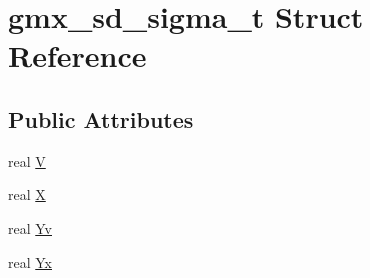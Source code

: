 \hypertarget{structgmx__sd__sigma__t}{\section{gmx\-\_\-sd\-\_\-sigma\-\_\-t \-Struct \-Reference}
\label{structgmx__sd__sigma__t}
}
\subsection*{\-Public \-Attributes}
\begin{DoxyCompactItemize}
\item 
real \hyperlink{structgmx__sd__sigma__t_a4862712468ca3935ed38720ba3581321}{\-V}
\item 
real \hyperlink{structgmx__sd__sigma__t_ad7691ca7af48a24392d2985051e1e9f5}{\-X}
\item 
real \hyperlink{structgmx__sd__sigma__t_a5be9817fe6d66dc070628378ae5a797d}{\-Yv}
\item 
real \hyperlink{structgmx__sd__sigma__t_af88780609e2a843b5039ac17c75bc079}{\-Yx}
\end{DoxyCompactItemize}


